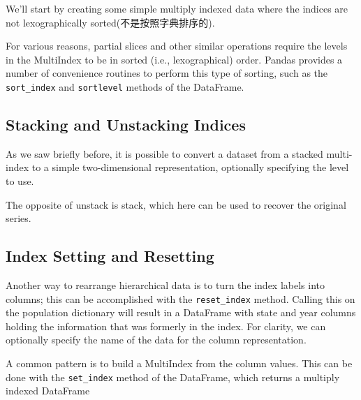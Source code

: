 We’ll start by creating some simple multiply indexed data where the indices are not
lexographically sorted(不是按照字典排序的).


For various reasons, partial slices and other similar operations require the levels in the MultiIndex to be in sorted (i.e., lexographical) order.
Pandas provides a number of convenience routines to perform this type of sorting,
such as the \verb|sort_index| and \verb|sortlevel| methods of the DataFrame.

\subsection*{Stacking and Unstacking Indices}
As we saw briefly before, it is possible to convert a dataset from a stacked multi-index
to a simple two-dimensional representation, optionally specifying the level to use.

The opposite of unstack is stack, which here can be used to recover the original
series.

\subsection*{Index Setting and Resetting}
Another way to rearrange hierarchical data is to turn the index labels into columns;
this can be accomplished with the \verb|reset_index| method. Calling this on the population dictionary will result in a DataFrame with state and year columns holding the
information that was formerly in the index. For clarity, we can optionally specify the
name of the data for the column representation.

A common pattern is to build a MultiIndex from the column values. This can be
done with the \verb|set_index| method of the DataFrame, which returns a multiply indexed
DataFrame
